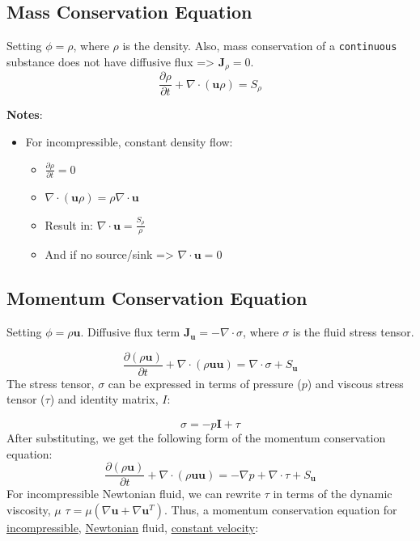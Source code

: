 \documentclass[11pt]{article}
\begin{document}
\subsection{Mass Conservation Equation}
\label{sec:org6835a7d}
Setting \(\phi = \rho\), where \(\rho\) is the density. Also, mass conservation of a \texttt{continuous} substance does not
have diffusive flux => \(\textbf{J}_\rho = 0\).
\begin{equation}
\frac{\partial \rho}{\partial t} + \nabla \cdot (\textbf{u}\rho) = S_\rho
\end{equation}

\textbf{Notes}:
\begin{itemize}
\item For incompressible, constant density flow:
\begin{itemize}
\item \(\frac{\partial \rho}{\partial t} = 0\)
\item \(\nabla \cdot (\textbf{u}\rho) = \rho \nabla \cdot \textbf{u}\)
\item Result in: \(\nabla \cdot \textbf{u} = \frac{S_\rho}{\rho}\)
\item And if no source/sink => \(\nabla \cdot \textbf{u} = 0\)
\end{itemize}
\end{itemize}

\subsection{Momentum Conservation Equation}
\label{sec:org8f510e3}
Setting \(\phi = \rho \textbf{u}\). Diffusive flux term \(\textbf{J}_\textbf{u} = -\nabla \cdot \sigma\), where
\(\sigma\) is the fluid stress tensor. 

\begin{equation}
\frac{\partial (\rho \textbf{u})}{\partial t} + \nabla \cdot (\rho \textbf{uu})  = \nabla \cdot \sigma +
S_\textbf{u}
\end{equation}
The stress tensor, \(\sigma\) can be expressed in terms of pressure (\(p\)) and viscous stress tensor (\(\tau\))
and identity matrix, \(I\):

\begin{equation}
\sigma = -p\textbf{I} + \tau
\end{equation}
After substituting, we get the following form of the momentum conservation equation:
\begin{equation}
\frac{\partial (\rho \textbf{u})}{\partial t} + \nabla \cdot (\rho \textbf{uu})  = -\nabla p + \nabla \cdot \tau
+ S_\textbf{u}
\end{equation}
For incompressible Newtonian fluid, we can rewrite \(\tau\) in terms of the dynamic viscosity, \(\mu\)
\(\tau = \mu(\nabla \textbf{u}+\nabla \textbf{u}^T)\).  Thus, a momentum conservation equation for \uline{incompressible},
\uline{Newtonian} fluid, \uline{constant velocity}:
\end{document}
